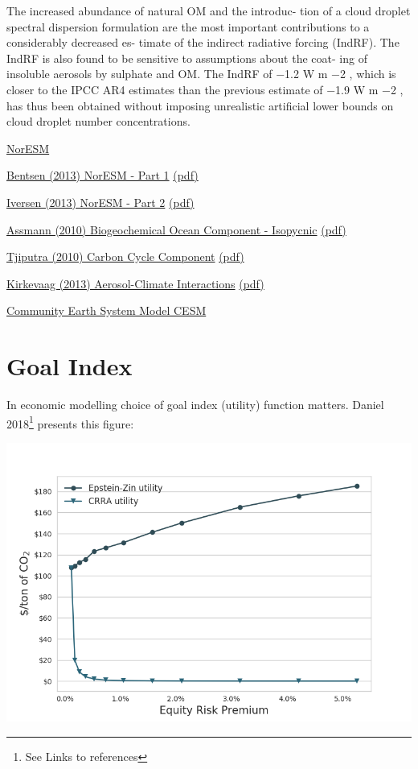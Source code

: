 \documentclass[
]{book}
\begin{document}
The increased abundance of natural OM and the introduc-
tion of a cloud droplet spectral dispersion formulation are the
most important contributions to a considerably decreased es-
timate of the indirect radiative forcing (IndRF). The IndRF
is also found to be sensitive to assumptions about the coat-
ing of insoluble aerosols by sulphate and OM. The IndRF of
−1.2 W m −2 , which is closer to the IPCC AR4 estimates than
the previous estimate of −1.9 W m −2 , has thus been obtained
without imposing unrealistic artificial lower bounds on cloud
droplet number concentrations.

\href{https://www.noresm.org/}{NorESM}

\href{https://gmd.copernicus.org/articles/6/687/2013/}{Bentsen (2013) NorESM - Part 1}
\href{pdf/Bentsen_2013_NorESM_1.pdf}{(pdf)}

\href{https://gmd.copernicus.org/articles/6/389/2013/}{Iversen (2013) NorESM - Part 2}
\href{pdf/Iversen_2013_NorESM_2.pdf}{(pdf)}

\href{https://gmd.copernicus.org/articles/3/143/2010/}{Assmann (2010) Biogeochemical Ocean Component - Isopycnic}
\href{pdf/Assmann_2010_Isopycnic_Ocean_Carbon_Cycle_Model.pdf}{(pdf)}

\href{https://gmd.copernicus.org/articles/3/123/2010/}{Tjiputra (2010) Carbon Cycle Component}
\href{pdf/Tjiputra_2010_Climate_Cycle_Feedbacks.pdf}{(pdf)}

\href{https://gmd.copernicus.org/articles/6/207/2013/}{Kirkevaag (2013) Aerosol-Climate Interactions}
\href{pdf/Kirkevaag_2013_Aerosol_NorESM.pdf}{(pdf)}

\href{https://www.cesm.ucar.edu/}{Community Earth System Model CESM}

\hypertarget{goal-index}{%
\section{Goal Index}\label{goal-index}}

In economic modelling choice of goal index (utility) function matters.
Daniel 2018\footnote{See Links to references} presents this figure:

\includegraphics{fig/fig_EZvsCRRA_daniel2018fig1.png}
\end{document}
